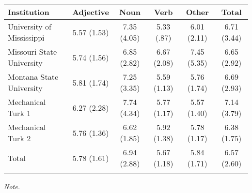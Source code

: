 \documentclass[english,man]{apa6}
\theoremstyle{definition}
\theoremstyle{definition}
\theoremstyle{definition}
\theoremstyle{remark}
\begin{document}
\begin{table}[tbp]
\begin{center}
\begin{threeparttable}
\caption{\label{tab:feature-table}}
\begin{tabular}{lccccc}
\toprule
Institution & Adjective & Noun & Verb & Other & Total\\
\midrule
University of Mississippi & 5.57 (1.53) & 7.35 (4.05) & 5.33 (.87) & 6.01 (2.11) & 6.71 (3.44)\\
Missouri State University & 5.74 (1.56) & 6.85 (2.82) & 6.67 (2.08) & 7.45 (5.35) & 6.65 (2.92)\\
Montana State University & 5.81 (1.74) & 7.25 (3.35) & 5.59 (1.13) & 5.76 (1.74) & 6.69 (2.93)\\
Mechanical Turk 1 & 6.27 (2.28) & 7.74 (4.34) & 5.77 (1.17) & 5.57 (1.40) & 7.14 (3.79)\\
Mechanical Turk 2 & 5.76 (1.36) & 6.62 (1.85) & 5.92 (1.38) & 5.78 (1.17) & 6.38 (1.75)\\
Total & 5.78 (1.61) & 6.94 (2.88) & 5.67 (1.18) & 5.84 (1.71) & 6.57 (2.60)\\
\bottomrule
\addlinespace
\end{tabular}
\begin{tablenotes}[para]
\textit{Note.} 
\end{tablenotes}
\end{threeparttable}
\end{center}
\end{table}
\end{document}
